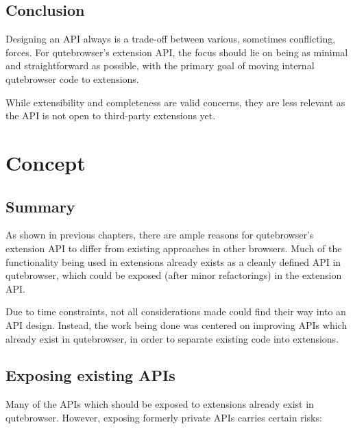 \documentclass[a4paper,parskip=full,DIV=14,BCOR=15mm]{scrreprt}
\begin{document}
\section{Conclusion}
Designing an API always is a trade-off between various, sometimes conflicting,
forces. For qutebrowser's extension API, the focus should lie on being as
minimal and straightforward as possible, with the primary goal of moving
internal qutebrowser code to extensions.

While extensibility and completeness are valid concerns, they are less relevant
as the API is not open to third-party extensions yet.

\chapter{Concept}
\label{ch:concept}

\section{Summary}
As shown in previous chapters, there are ample reasons for qutebrowser's
extension API to differ from existing approaches in other browsers. Much of the
functionality being used in extensions already exists as a cleanly defined API
in qutebrowser, which could be exposed (after minor refactorings) in the
extension API.

Due to time constraints, not all considerations made could find their way into
an API design. Instead, the work being done was centered on improving APIs which
already exist in qutebrowser, in order to separate existing code into extensions.

\section{Exposing existing APIs}
Many of the APIs which should be exposed to extensions already exist in
qutebrowser. However, exposing formerly private APIs carries certain risks:
\end{document}
